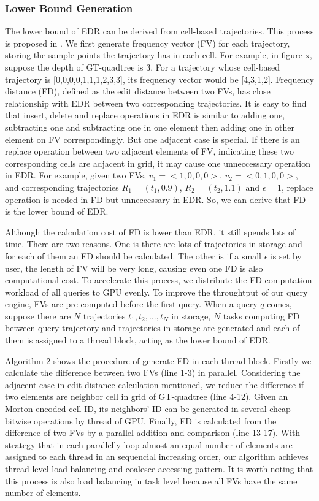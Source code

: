 \documentclass[conference]{IEEEtran}
\begin{document}
\subsubsection{Lower Bound Generation}
The lower bound of EDR can be derived from cell-based trajectories. This process is proposed in \cite{DBLP:conf/sigmod/ChenOO05}. We first generate frequency vector (FV) for each trajectory, storing the sample points the trajectory has in each cell. For example, in figure x, suppose the depth of GT-quadtree is 3. For a trajectory whose cell-based trajectory is [0,0,0,0,1,1,1,2,3,3], its frequency vector would be [4,3,1,2]. Frequency distance (FD), defined as the edit distance between two FVs, has close relationship with EDR between two corresponding trajectories. It is easy to find that insert, delete and replace operations in EDR is similar to adding one, subtracting one and subtracting one in one element then adding one in other element on FV correspondingly. But one adjacent case is special. If there is an replace operation between two adjacent elements of FV, indicating these two corresponding cells are adjacent in grid, it may cause one unneccessary operation in EDR. For example, given two FVs, $v_{1}=<1,0,0,0>$, $v_{2}=<0,1,0,0>$, and corresponding trajectories $R_{1}=(t_{1},0.9)$, $R_{2}=(t_{2},1.1)$ and $\epsilon =1$, replace operation is needed in FD but unneccessary in EDR. So, we can derive that FD is the lower bound of EDR.

Although the calculation cost of FD is lower than EDR, it still spends lots of time. There are two reasons. One is there are lots of trajectories in storage and for each of them an FD should be calculated. The other is if a small $\epsilon$ is set by user, the length of FV will be very long, causing even one FD is also computational cost. To accelerate this process, we distribute the FD computation workload of all queries to GPU evenly. To improve the throughtput of our query engine, FVs are pre-computed before the first query. When a query $q$ comes, suppose there are $N$ trajectories $t_{1},t_{2},...,t_{N}$ in storage, $N$ tasks computing FD between query trajectory and trajectories in storage are generated and each of them is assigned to a thread block, acting as the lower bound of EDR. 

Algorithm 2 shows the procedure of generate FD in each thread block. Firstly we calculate the difference between two FVs (line 1-3) in parallel. Considering the adjacent case in edit distance calculation mentioned, we reduce the difference if two elements are neighbor cell in grid of GT-quadtree (line 4-12). Given an Morton encoded cell ID, its neighbors' ID can be generated in several cheap bitwise operations by thread of GPU. Finally, FD is calculated from the difference of two FVs by a parallel addition and comparison (line 13-17). With strategy that in each parallelly loop almost an equal number of elements are assigned to each thread in an sequencial increasing order, our algorithm achieves thread level load balancing and coalesce accessing pattern. It is worth noting that this process is also load balancing in task level because all FVs have the same number of elements.
\end{document}
